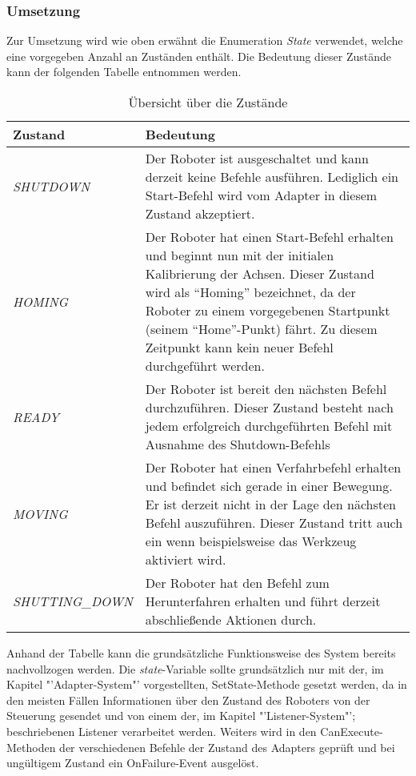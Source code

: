 \subsubsection{Umsetzung}
Zur Umsetzung wird wie oben erwähnt die Enumeration \textit{State} verwendet, welche eine vorgegeben Anzahl an Zuständen enthält. Die Bedeutung dieser Zustände kann der folgenden Tabelle entnommen werden.
\newline
\begin{table}
\begin{tabular}{|p{4cm}|p{10cm}|}
\hline \rowcolor{lightgray}
\textbf{Zustand} & \textbf{Bedeutung}\\
\hline
\textit{SHUTDOWN} & Der Roboter ist ausgeschaltet und kann derzeit keine Befehle ausführen. Lediglich ein Start-Befehl wird vom Adapter in diesem Zustand akzeptiert.\\
\hline
\textit{HOMING} & Der Roboter hat einen Start-Befehl erhalten und beginnt nun mit der initialen Kalibrierung der Achsen. Dieser Zustand wird als “Homing” bezeichnet, da der Roboter zu einem vorgegebenen Startpunkt (seinem “Home”-Punkt) fährt. Zu diesem Zeitpunkt kann kein neuer Befehl durchgeführt werden.\\
\hline
\textit{READY} & Der Roboter ist bereit den nächsten Befehl durchzuführen. Dieser Zustand besteht nach jedem erfolgreich durchgeführten Befehl mit Ausnahme des Shutdown-Befehls \\
\hline
\textit{MOVING} & Der Roboter hat einen Verfahrbefehl erhalten und befindet sich gerade in einer Bewegung. Er ist derzeit nicht in der Lage den nächsten Befehl auszuführen. Dieser Zustand tritt auch ein wenn beispielsweise das Werkzeug aktiviert wird.\\
\hline
\textit{SHUTTING\_DOWN} & Der Roboter hat den Befehl zum Herunterfahren erhalten und führt derzeit abschließende Aktionen durch.\\ 
\hline
\end{tabular}
\caption{Übersicht über die Zustände}
\end{table}
\newline
\newline
Anhand der Tabelle kann die grundsätzliche Funktionsweise des System bereits nachvollzogen werden. Die \textit{state}-Variable sollte grundsätzlich nur mit der, im Kapitel "'Adapter-System"' vorgestellten, SetState-Methode gesetzt werden, da in den meisten Fällen Informationen über den Zustand des Roboters von der Steuerung gesendet und von einem der, im Kapitel "'Listener-System"'; beschriebenen Listener verarbeitet werden. Weiters wird in den CanExecute-Methoden der verschiedenen Befehle der Zustand des Adapters geprüft und bei ungültigem Zustand ein OnFailure-Event ausgelöst.
